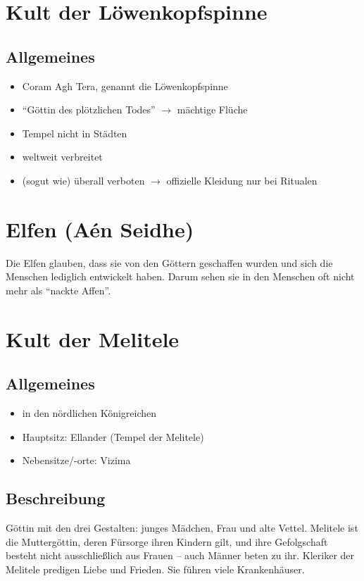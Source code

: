 \section{Kult der Löwenkopfspinne}
\subsection{Allgemeines}
\begin{itemize}
\item Coram Agh Tera, genannt die Löwenkopfspinne
\item "`Göttin des plötzlichen Todes"' $ \rightarrow $ mächtige Flüche
\item Tempel nicht in Städten
\item weltweit verbreitet
\item (sogut wie) überall verboten $ \rightarrow $ offizielle Kleidung nur bei Ritualen
\end{itemize}

\section{Elfen (Aén Seidhe)}
Die Elfen glauben, dass sie von den Göttern geschaffen wurden und sich die Menschen lediglich entwickelt haben. Darum sehen sie in den Menschen oft nicht mehr als "`nackte Affen"'. 

\section{Kult der Melitele}
\subsection{Allgemeines}
\begin{itemize}
\item in den nördlichen Königreichen
\item Hauptsitz: Ellander (Tempel der Melitele)
\item Nebensitze/-orte: Vizima
\end{itemize}

\subsection{Beschreibung}
Göttin mit den drei Gestalten: junges Mädchen, Frau und alte Vettel. Melitele ist die Muttergöttin, deren Fürsorge ihren Kindern gilt, und ihre Gefolgschaft besteht nicht ausschließlich aus Frauen – auch Männer beten zu ihr. Kleriker der Melitele predigen Liebe und Frieden. Sie führen viele Krankenhäuser. 
